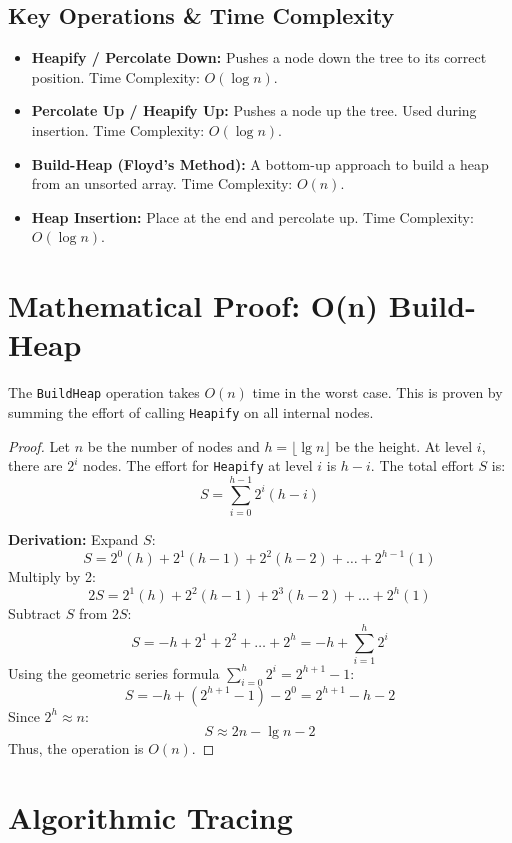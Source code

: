 \subsection{Key Operations \& Time Complexity}
\begin{itemize}
    \item \textbf{Heapify / Percolate Down:} Pushes a node down the tree to its correct position. Time Complexity: $O(\log n)$.
    \item \textbf{Percolate Up / Heapify Up:} Pushes a node up the tree. Used during insertion. Time Complexity: $O(\log n)$.
    \item \textbf{Build-Heap (Floyd's Method):} A bottom-up approach to build a heap from an unsorted array. Time Complexity: $O(n)$.
    \item \textbf{Heap Insertion:} Place at the end and percolate up. Time Complexity: $O(\log n)$.
\end{itemize}

\section{Mathematical Proof: O(n) Build-Heap}

\begin{theorem}
The \texttt{BuildHeap} operation takes $O(n)$ time in the worst case. This is proven by summing the effort of calling \texttt{Heapify} on all internal nodes.
\end{theorem}

\begin{proof}
Let $n$ be the number of nodes and $h = \lfloor \lg n \rfloor$ be the height. At level $i$, there are $2^i$ nodes. The effort for \texttt{Heapify} at level $i$ is $h - i$.
The total effort $S$ is:
$$S = \sum_{i=0}^{h-1} 2^i (h - i)$$

\textbf{Derivation:}
Expand $S$:
$$S = 2^0(h) + 2^1(h-1) + 2^2(h-2) + \dots + 2^{h-1}(1)$$
Multiply by 2:
$$2S = 2^1(h) + 2^2(h-1) + 2^3(h-2) + \dots + 2^h(1)$$
Subtract $S$ from $2S$:
$$S = -h + 2^1 + 2^2 + \dots + 2^h = -h + \sum_{i=1}^{h} 2^i$$
Using the geometric series formula $\sum_{i=0}^{h} 2^i = 2^{h+1} - 1$:
$$S = -h + (2^{h+1} - 1) - 2^0 = 2^{h+1} - h - 2$$
Since $2^h \approx n$:
$$S \approx 2n - \lg n - 2$$
Thus, the operation is $O(n)$.
\end{proof}

\newpage
\section{Algorithmic Tracing}

